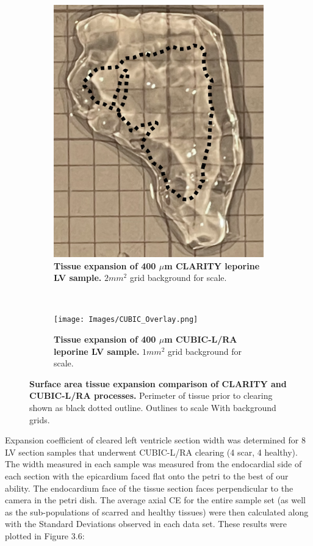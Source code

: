 \begin{figure}[H]
\centering
    \begin{subfigure}[t]{0.45\textwidth}
        \centering
        \includegraphics[width=1\linewidth]{Images/CLARITY_Overlay.png}
        \caption{\textbf{Tissue expansion of 400 $\mu$m CLARITY leporine LV sample.} $2 mm^2$ grid background for scale.}
    \end{subfigure}
    ~
    \begin{subfigure}[t]{0.45\textwidth}
        \centering
        \texttt{[image: Images/CUBIC\_Overlay.png]}
        \caption{\textbf{Tissue expansion of 400 $\mu$m CUBIC-L/RA leporine LV sample.} $1 mm^2$ grid background for scale.}
    \end{subfigure}
    \caption{\textbf{Surface area tissue expansion comparison of CLARITY and CUBIC-L/RA processes.} Perimeter of tissue prior to clearing shown as black dotted outline. Outlines to scale With background grids.}
    \label{fig:enter-label}
\end{figure}


Expansion coefficient of cleared left ventricle section width was determined for 8 LV section samples that underwent CUBIC-L/RA clearing (4 scar, 4 healthy). The width measured in each sample was measured from the endocardial side of each section with the epicardium faced flat onto the petri to the best of our ability. The endocardium face of the tissue section faces perpendicular to the camera in the petri dish. The average axial CE for the entire sample set (as well as the sub-populations of scarred and healthy tissues) were then calculated along with the Standard Deviations observed in each data set. These results were plotted in Figure 3.6:  


